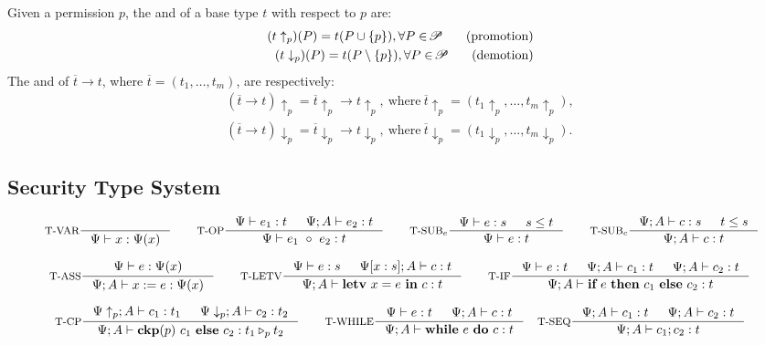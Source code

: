 {{{\begin{definition}\label{def:updown}
Given a permission $p$, the  and  of a base type $t$
with respect to $p$ are: 
{\myeqsize\begin{align*}
(t\uparrow_{p}) (P) = t(P\cup \{p\}), \forall P\in \!\mathscr{P}\!
\tag{promotion}
\\
(t\downarrow_{p}) (P) = t(P\setminus\{p\}), \forall P\in \!\mathscr{P}\!
\tag{demotion}
\end{align*}}
The  and  of $\overline{t}\rightarrow t$,
where $\overline{t} = (t_1,\dots, t_m)$, are respectively:
{\myeqsize\begin{align*}
(\overline{t}\rightarrow t)\uparrow_{p} = \overline{t}\uparrow_{p} \rightarrow t\uparrow_{p},~
\text{where}~\overline{t}\uparrow_{p} = (t_1\uparrow_{p},\ldots, t_m\uparrow_{p}),
\\
(\overline{t}\rightarrow t)\downarrow_{p} = \overline{t}\downarrow_{p}\rightarrow t\downarrow_{p},~
\text{where}~\overline{t}\downarrow_{p} = (t_1\downarrow_{p},\ldots, t_m\downarrow_{p}).
\end{align*}}
\end{definition}








\subsection{Security Type System}\label{sec:typing_rules}


\begin{figure*}
\tiny
\[
\inference[T-VAR]{}
{\Psi \vdash \leVAR{x} : \Psi(x)}
\qquad
\inference[T-OP]
{\Psi\vdash e_1: t & \Psi ; A\vdash e_2: t}
{\Psi\vdash \leOP{e_1}{e_2} : t}
\qquad
\inference[T-SUB$_{e}$]
{\Psi\vdash e : s & s \leq t}
{\Psi\vdash e : t}
\qquad
\inference[T-SUB$_{c}$]
{\Psi; A \vdash c : s & t \leq s}
{\Psi; A\vdash c : t}
\]

\[
\inference[T-ASS]
{\Psi \vdash e : \Psi(x)}
{\Psi ;A \vdash \lcASS{x}{e} : \Psi(x)}
\qquad
\inference[T-LETV]
{\Psi \vdash e : s &
\Psi[x:s]; A \vdash c : t }
{\Psi; A\vdash \lcLETV{x}{e}{c} :  t}
\qquad
\inference[T-IF]
{\Psi \vdash e : t & \Psi ; A\vdash c_1 : t & \Psi; A \vdash c_2 : t }
{\Psi; A \vdash \lcIF{e}{c_1}{c_2} : t}
\]

\[
\inference[T-CP]
{\Psi\uparrow_{p} ; A \vdash c_1 : t_1 &
\Psi\downarrow_{p} ; A\vdash c_2 : t_2}
{\Psi; A\vdash \lcCP{p}{c_1}{c_2} : \omerge p {t_1} {t_2}}
\qquad
\inference[T-WHILE]
{\Psi \vdash e : t & \Psi ; A\vdash c : t  }
{\Psi; A \vdash \lcWHILE{e}{c} : t }
\quad
\inference[T-SEQ]
{\Psi; A\vdash c_1 : t & \Psi ; A\vdash c_2 : t }
{\Psi ; A\vdash \lcSEQ{c_1}{c_2} : t}
\]


\end{figure*}}}}

